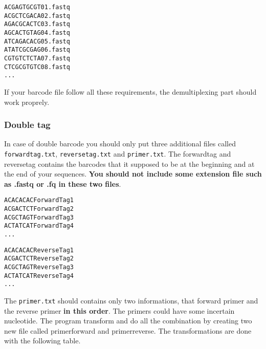 \documentclass{article}\usepackage[]{graphicx}\usepackage[]{color}
\makeatletter
\newenvironment{kframe}{%
 \def\at@end@of@kframe{}%
 \ifinner\ifhmode%
  \def\at@end@of@kframe{\end{minipage}}%
  \begin{minipage}{\columnwidth}%
 \fi\fi%
 \def\FrameCommand##1{\hskip\@totalleftmargin \hskip-\fboxsep
 \colorbox{shadecolor}{##1}\hskip-\fboxsep
     \hskip-\linewidth \hskip-\@totalleftmargin \hskip\columnwidth}%
 \MakeFramed {\advance\hsize-\width
   \@totalleftmargin\z@ \linewidth\hsize
   \@setminipage}}%
 {\par\unskip\endMakeFramed%
 \at@end@of@kframe}
\newenvironment{knitrout}{}{} %
\makeatother
\begin{document}
\begin{knitrout}
\color{fgcolor}\begin{kframe}
\begin{alltt}
ACGAGTGCGT	01.fastq
ACGCTCGACA	02.fastq
AGACGCACTC	03.fastq
AGCACTGTAG	04.fastq
ATCAGACACG	05.fastq
ATATCGCGAG	06.fastq
CGTGTCTCTA	07.fastq
CTCGCGTGTC	08.fastq
...
\end{alltt}
\end{kframe}
\end{knitrout}

If your barcode file follow all these requirements, the demultiplexing part should work proprely.

\subsubsection{Double tag}
 In case of double barcode you should only put three additional files called \texttt{forwardtag.txt},
 \texttt{reversetag.txt} and \texttt{primer.txt}. The forwardtag and reversetag contains the barcodes that it supposed to be at the beginning and at the end of your sequences. \textbf{You should not include some extension file such as .fastq or .fq in these two files}.


\begin{knitrout}
\color{fgcolor}\begin{kframe}
\begin{alltt}
ACACACAC	ForwardTag1
ACGACTCT	ForwardTag2
ACGCTAGT	ForwardTag3
ACTATCAT	ForwardTag4
...
\end{alltt}
\end{kframe}
\end{knitrout}

\begin{knitrout}
\color{fgcolor}\begin{kframe}
\begin{alltt}
ACACACAC	ReverseTag1
ACGACTCT	ReverseTag2
ACGCTAGT	ReverseTag3
ACTATCAT	ReverseTag4
...
\end{alltt}
\end{kframe}
\end{knitrout}


The \texttt{primer.txt} should contains only two informations, that forward primer and the reverse primer \textbf{in this order}.
The primers could have some incertain nucleotide. The program transform and do all the combination by creating two new file called primerforward and primerreverse. The transformations are done with the following table.
\end{document}
